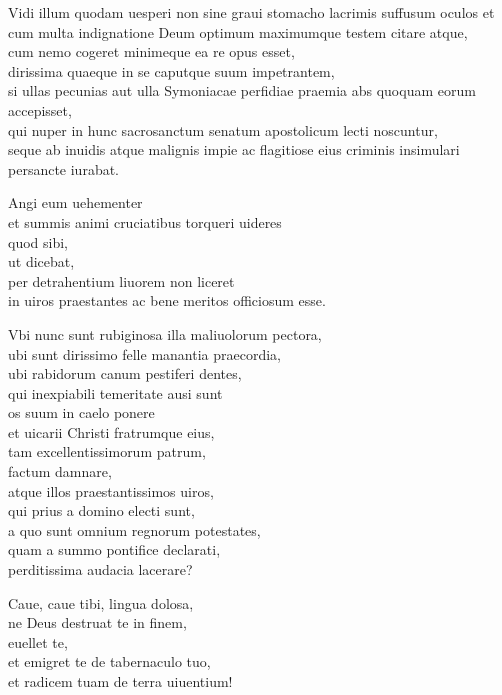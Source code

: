\documentclass[a5paper,twoside]{article}
\begin{document}
Vidi illum quodam uesperi non sine graui stomacho lacrimis suffusum oculos et cum multa indignatione Deum optimum maximumque testem citare atque, \\
cum nemo cogeret minimeque ea re opus esset, \\
dirissima quaeque in se caputque suum impetrantem, \\
si ullas pecunias aut ulla Symoniacae perfidiae praemia abs quoquam eorum accepisset, \\
qui nuper in hunc sacrosanctum senatum apostolicum lecti noscuntur, \\
seque ab inuidis atque malignis impie ac flagitiose eius criminis insimulari persancte iurabat. 

Angi eum uehementer \\
et summis animi cruciatibus torqueri uideres \\
quod sibi, \\
ut dicebat, \\
per detrahentium liuorem non liceret \\
in uiros praestantes ac bene meritos officiosum esse.

Vbi nunc sunt rubiginosa illa maliuolorum pectora, \\
ubi sunt dirissimo felle manantia praecordia, \\
ubi rabidorum canum pestiferi dentes, \\
qui inexpiabili temeritate ausi sunt \\
os suum in caelo ponere \\
et uicarii Christi fratrumque eius, \\
tam excellentissimorum patrum, \\
factum damnare, \\
atque illos praestantissimos uiros, \\
qui prius a domino electi sunt, \\
a quo sunt omnium regnorum potestates, \\
quam a summo pontifice declarati, \\
perditissima audacia lacerare?  

Caue, caue tibi, lingua dolosa, \\
ne Deus destruat te in finem, \\
euellet te, \\
et emigret te de tabernaculo tuo, \\
et radicem tuam de terra uiuentium! 
\end{document}
